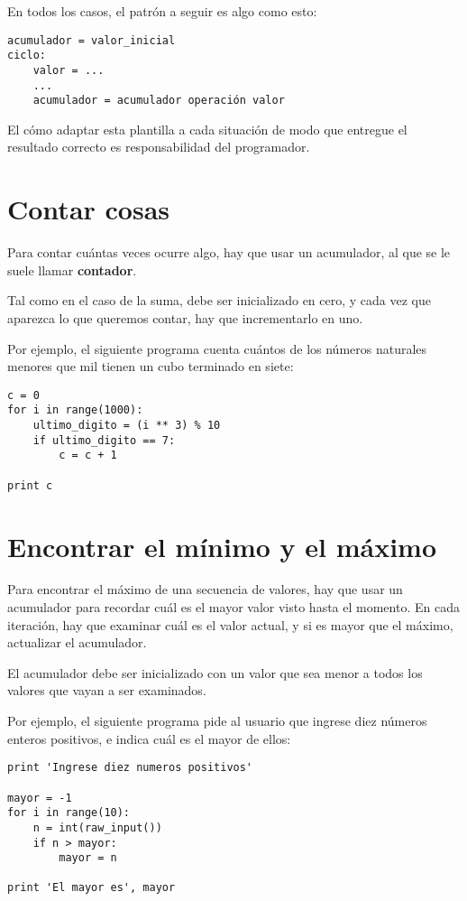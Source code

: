 En todos los casos, el patrón a seguir es algo como esto:

\begin{lstlisting}
acumulador = valor_inicial
ciclo:
    valor = ...
    ...
    acumulador = acumulador operación valor
\end{lstlisting}

El cómo adaptar esta plantilla a cada situación de modo que entregue el
resultado correcto es responsabilidad del programador.

\section{Contar cosas}

Para contar cuántas veces ocurre algo, hay que usar un acumulador, al
que se le suele llamar \textbf{contador}.

Tal como en el caso de la suma, debe ser inicializado en cero, y cada
vez que aparezca lo que queremos contar, hay que incrementarlo en uno.

Por ejemplo, el siguiente programa cuenta cuántos de los números
naturales menores que mil tienen un cubo terminado en siete:

\begin{lstlisting}
c = 0
for i in range(1000):
    ultimo_digito = (i ** 3) % 10
    if ultimo_digito == 7:
        c = c + 1

print c
\end{lstlisting}

\section{Encontrar el mínimo y el máximo}

Para encontrar el máximo de una secuencia de valores, hay que usar un
acumulador para recordar cuál es el mayor valor visto hasta el momento.
En cada iteración, hay que examinar cuál es el valor actual, y si es
mayor que el máximo, actualizar el acumulador.

El acumulador debe ser inicializado con un valor que sea menor a todos
los valores que vayan a ser examinados.

Por ejemplo, el siguiente programa pide al usuario que ingrese diez
números enteros positivos, e indica cuál es el mayor de ellos:

\begin{lstlisting}
print 'Ingrese diez numeros positivos'

mayor = -1
for i in range(10):
    n = int(raw_input())
    if n > mayor:
        mayor = n

print 'El mayor es', mayor
\end{lstlisting}

